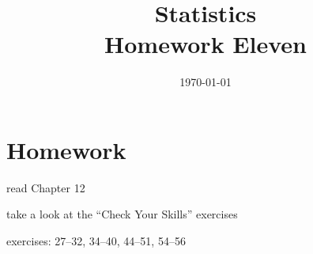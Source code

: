 \documentclass[letterpaper, landscape]{exam}
\title{Statistics \\ Homework Eleven}
\date{\today}
\author{}
\begin{document}
  \maketitle

  \section{Homework}
  \ifprintanswers{}
  \else
    \begin{itemize*}
      \item read Chapter 12 
      \item take a look at the ``Check Your Skills'' exercises
      \item exercises: 27--32, 34--40, 44--51, 54--56
    \end{itemize*}
  \fi

  \ifprintanswers{}
\end{document}
